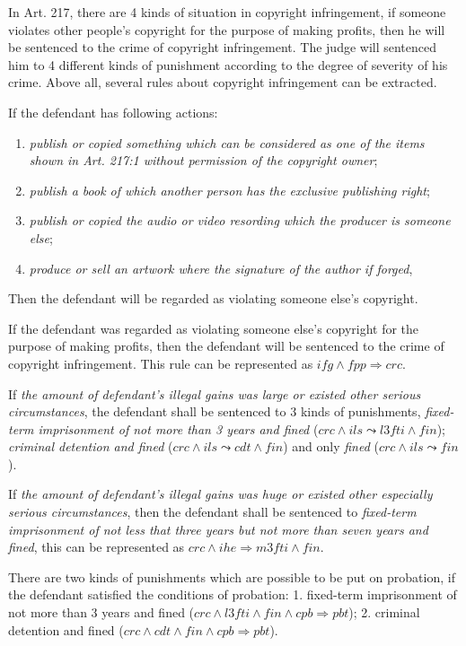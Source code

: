 \documentclass{IOS-Book-Article}
\begin{document}
\normalsize
In Art. 217, there are 4 kinds of situation in copyright infringement, if someone violates other people's copyright for the purpose of making profits, then he will be sentenced to the crime of copyright infringement. The judge will sentenced him to 4 different kinds of punishment according to the degree of severity of his crime. Above all, several rules about copyright infringement can be extracted.

If the defendant has following actions:
\begin{enumerate}
\item \textit{publish or copied something which can be considered as one of the items shown in Art. 217:1 without permission of the copyright owner};
\item \textit{publish a book of which another person has the exclusive publishing right};
\item  \textit{publish or copied the audio or video resording which the producer is someone else};
\item \textit{produce or sell an artwork where the signature of the author if forged},
\end{enumerate}
Then the defendant will be regarded as violating someone else's copyright.

If the defendant was regarded as violating someone else's copyright for the purpose of making profits, then the defendant will be sentenced to the crime of copyright infringement. This rule can be represented as $ifg \wedge fpp \Rightarrow crc$.

If \textit{the amount of defendant's illegal gains was large or existed other serious circumstances}, the defendant shall be sentenced to 3 kinds of punishments, \textit{fixed-term imprisonment of not more than 3 years and fined} ($crc \wedge ils \leadsto l3fti \wedge fin$); \textit{criminal detention and fined} ($crc \wedge ils \leadsto cdt \wedge fin$) and only \textit{fined} ($crc \wedge ils \leadsto fin$).

If \textit{the amount of defendant's illegal gains was huge or existed other especially serious circumstances}, then the defendant shall be sentenced to \textit{fixed-term imprisonment of not less that three years but not more than seven years and fined}, this can be represented as $crc \wedge ihe \Rightarrow m3fti \wedge fin$.

There are two kinds of punishments which are possible to be put on probation, if the defendant satisfied the conditions of probation: 
1. fixed-term imprisonment of not more than 3 years and fined ($crc \wedge l3fti \wedge fin \wedge cpb \Rightarrow pbt$); 2. criminal detention and fined ($crc \wedge cdt \wedge fin \wedge cpb \Rightarrow pbt$).
\end{document}
